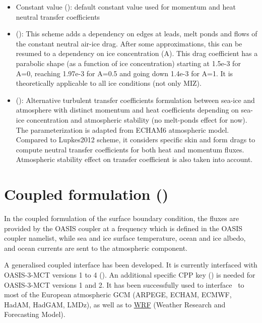 \documentclass[../main/NEMO_manual]{subfiles}
\begin{document}
\begin{itemize}
\item Constant value ():
  default constant value used for momentum and heat neutral transfer coefficients
\item \citet{lupkes.gryanik.ea_JGRA12} ():
  This scheme adds a dependency on edges at leads, melt ponds and flows
  of the constant neutral air-ice drag. After some approximations,
  this can be resumed to a dependency on ice concentration (A).
  This drag coefficient has a parabolic shape (as a function of ice concentration)
  starting at 1.5e-3 for A=0, reaching 1.97e-3 for A=0.5 and going down 1.4e-3 for A=1.
  It is theoretically applicable to all ice conditions (not only MIZ).
\item \citet{lupkes.gryanik_JGR15} ():
  Alternative turbulent transfer coefficients formulation between sea-ice
  and atmosphere with distinct momentum and heat coefficients depending
  on sea-ice concentration and atmospheric stability (no melt-ponds effect for now).
  The parameterization is adapted from ECHAM6 atmospheric model.
  Compared to Lupkes2012 scheme, it considers specific skin and form drags
  to compute neutral transfer coefficients for both heat and momentum fluxes.
  Atmospheric stability effect on transfer coefficient is also taken into account.
\end{itemize}

\section[Coupled formulation (\textit{sbccpl.F90})]{Coupled formulation (\protect{})}
\label{sec:SBC_cpl}

\begin{listing}
  \caption{}
  \label{lst:namsbc_cpl}
\end{listing}

In the coupled formulation of the surface boundary condition,
the fluxes are provided by the OASIS coupler at a frequency which is defined in the OASIS coupler namelist,
while sea and ice surface temperature, ocean and ice albedo, and ocean currents are sent to
the atmospheric component.

A generalised coupled interface has been developed.
It is currently interfaced with OASIS-3-MCT versions 1 to 4 ().
An additional specific CPP key () is needed for OASIS-3-MCT versions 1 and 2.
It has been successfully used to interface \NEMO\ to most of the European atmospheric GCM
(ARPEGE, ECHAM, ECMWF, HadAM, HadGAM, LMDz), as well as to \href{http://wrf-model.org/}{WRF}
(Weather Research and Forecasting Model).
\end{document}
